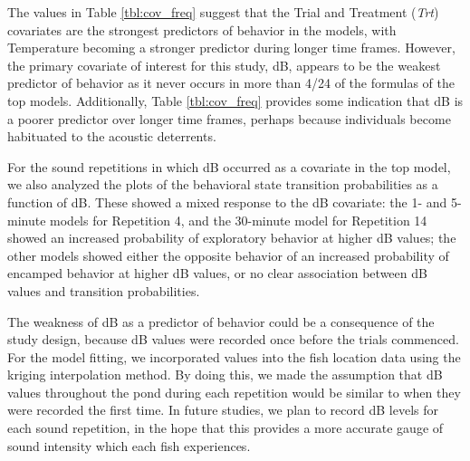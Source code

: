 \documentclass[12pt]{article}
\begin{document}
	The values in Table \ref{tbl:cov_freq} suggest that the Trial and Treatment (\emph{Trt}) covariates are the strongest predictors of behavior in the models, with Temperature becoming a stronger predictor during longer time frames. However, the primary covariate of interest for this study, dB, appears to be the weakest predictor of behavior as it never occurs in more than 4/24 of the formulas of the top models. Additionally, Table \ref{tbl:cov_freq} provides some indication that dB is a poorer predictor over longer time frames, perhaps because individuals become habituated to the acoustic deterrents. 
	
	For the sound repetitions in which dB occurred as a covariate in the top model, we also analyzed the plots of the behavioral state transition probabilities as a function of dB. These showed a mixed response to the dB covariate: the 1- and 5-minute models for Repetition 4, and the 30-minute model for Repetition 14 showed an increased probability of exploratory behavior at higher dB values; the other models showed either the opposite behavior of an increased probability of encamped behavior at higher dB values, or no clear association between dB values and transition probabilities.
		
	The weakness of dB as a predictor of behavior could be a consequence of the study design, because dB values were recorded once before the trials commenced. For the model fitting, we incorporated values into the fish location data using the kriging interpolation method. By doing this, we made the assumption that dB values throughout the pond during each repetition would be similar to when they were recorded the first time. In future studies, we plan to record dB levels for each sound repetition, in the hope that this provides a more accurate gauge of sound intensity which each fish experiences.



\end{document}
